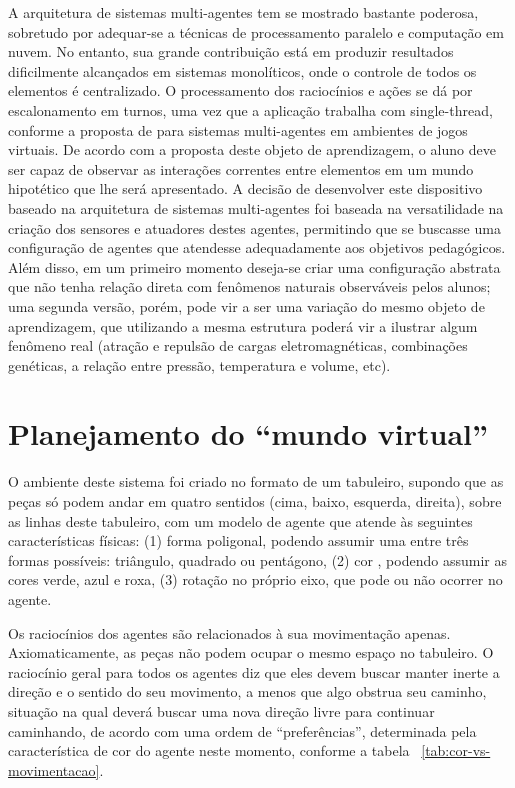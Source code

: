 \documentclass{article}
\begin{document}
A arquitetura de sistemas multi-agentes tem se mostrado bastante poderosa,
sobretudo por adequar-se a técnicas de processamento paralelo e computação em nuvem.
No entanto, sua grande contribuição está em produzir resultados dificilmente
alcançados em sistemas monolíticos, onde o controle de todos os elementos é
centralizado. O processamento dos raciocínios e ações se dá por escalonamento em
turnos, uma vez que a aplicação trabalha com single-thread, conforme a proposta de
\cite{behrens-2010} para sistemas multi-agentes em ambientes de jogos virtuais.
De acordo com a proposta deste objeto de aprendizagem, o aluno deve ser capaz
de observar as interações correntes entre elementos em um mundo hipotético que lhe
será apresentado. A decisão de desenvolver este dispositivo baseado na arquitetura de
sistemas multi-agentes foi baseada na versatilidade na criação dos sensores e atuadores
destes agentes, permitindo que se buscasse uma configuração de agentes que atendesse
adequadamente aos objetivos pedagógicos. Além disso, em um primeiro momento
deseja-se criar uma configuração abstrata que não tenha relação direta com fenômenos
naturais observáveis pelos alunos; uma segunda versão, porém, pode vir a ser uma
variação do mesmo objeto de aprendizagem, que utilizando a mesma estrutura poderá
vir a ilustrar algum fenômeno real (atração e repulsão de cargas eletromagnéticas,
combinações genéticas, a relação entre pressão, temperatura e volume, etc).

\section{Planejamento do ``mundo virtual''}

O ambiente deste sistema foi criado no formato de um tabuleiro, supondo que as peças
só podem andar em quatro sentidos (cima, baixo, esquerda, direita), sobre as linhas
deste tabuleiro, com um modelo de agente que atende às seguintes características
físicas: (1) forma poligonal, podendo assumir uma entre três formas possíveis:
triângulo, quadrado ou pentágono, (2) cor , podendo assumir as cores verde, azul e roxa,
(3) rotação no próprio eixo, que pode ou não ocorrer no agente.

Os raciocínios dos agentes são relacionados à sua movimentação apenas.
Axiomaticamente, as peças não podem ocupar o mesmo espaço no tabuleiro. O
raciocínio geral para todos os agentes diz que eles devem buscar manter inerte a direção
e o sentido do seu movimento, a menos que algo obstrua seu caminho, situação na qual
deverá buscar uma nova direção livre para continuar caminhando, de acordo com uma
ordem de “preferências”, determinada pela característica de cor do agente neste
momento, conforme a tabela ~\ref{tab:cor-vs-movimentacao}.
\end{document}
